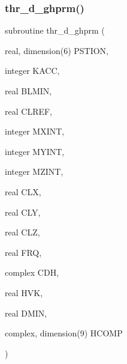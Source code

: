 \subsubsection{\texorpdfstring{thr\+\_\+d\+\_\+ghprm()}{thr\_d\_ghprm()}}
{\footnotesize\ttfamily subroutine thr\+\_\+d\+\_\+ghprm (\begin{DoxyParamCaption}\item[{real, dimension(6)}]{P\+S\+T\+I\+ON,  }\item[{integer}]{K\+A\+CC,  }\item[{real}]{B\+L\+M\+IN,  }\item[{real}]{C\+L\+R\+EF,  }\item[{integer}]{M\+X\+I\+NT,  }\item[{integer}]{M\+Y\+I\+NT,  }\item[{integer}]{M\+Z\+I\+NT,  }\item[{real}]{C\+LX,  }\item[{real}]{C\+LY,  }\item[{real}]{C\+LZ,  }\item[{real}]{F\+RQ,  }\item[{complex}]{C\+DH,  }\item[{real}]{H\+VK,  }\item[{real}]{D\+M\+IN,  }\item[{complex, dimension(9)}]{H\+C\+O\+MP }\end{DoxyParamCaption})}

